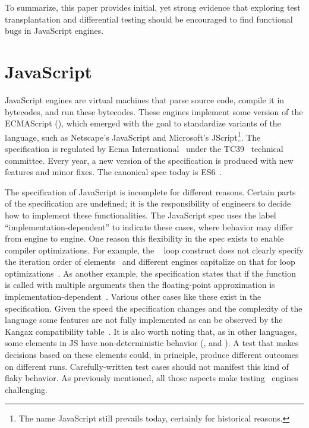\documentclass[smallextended]{svjour3}
\begin{document}
\vspace{1ex} To summarize, this paper provides initial, yet strong evidence
that exploring test transplantation and differential testing
should be encouraged to find functional bugs
in JavaScript engines.

\section{JavaScript}
\label{sec:es6-design}
\label{sec:imp-dep-behavior}

JavaScript engines are virtual machines that parse source code,
compile it in bytecodes, and run these bytecodes. These engines
implement some version of the ECMAScript (\es{}), which emerged with
the goal to standardize variants of the language, such as Netscape's
JavaScript and Microsoft's JScript\footnote{The name JavaScript still
  prevails today, certainly for historical reasons.}. The \es{}
specification is regulated by Ecma International~\cite{es6-website}
under the TC39~\cite{tc39-github} technical committee.  Every year, a
new version of the \es{} specification is produced with new features
and minor fixes. The canonical spec today is
ES6~\cite{ecmas262-spec-repo,ecmas262-spec}.


The specification of JavaScript is incomplete for different
reasons. Certain parts of the specification are undefined; it is
the responsibility of engineers to decide how to implement these
functionalities. The JavaScript spec uses the label
``implementation-dependent'' to indicate these cases, where behavior
may differ from engine to engine. One reason this flexibility in the
spec exists to enable compiler optimizations. For example, the
\js\  loop construct does not clearly specify the
iteration order of
elements~\cite{so-forin-undefined,javascript-in-chrome} and different
engines capitalize on that for loop
optimizations~\cite{for-in-undefined}.  As another example, the
specification states that if the 
function is called with multiple arguments then the floating-point
approximation is
implementation-dependent~\cite{es6-toPrecision}. Various other cases
like these exist in the specification. Given the speed the
specification changes and the complexity of the language some features
are not fully implemented as can be observed by the Kangax
compatibility table~\cite{kangax}.  It is also worth noting that, as
in other languages, some elements in JS have non-deterministic
behavior (\eg{},  and ). A test
that makes decisions based on these elements could, in principle,
produce different outcomes on different runs. Carefully-written test
cases should not manifest this kind of flaky behavior.  As previously
mentioned, all those aspects make testing \js\ engines challenging.
\end{document}
